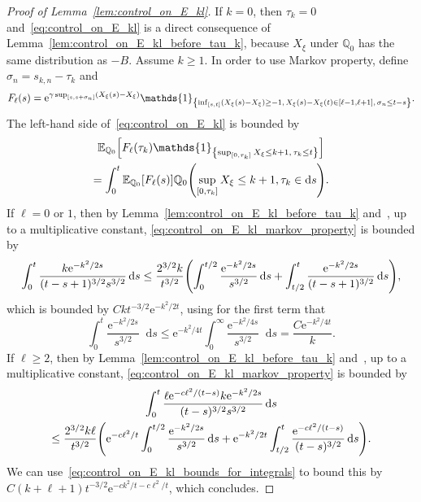 \documentclass[10pt]{amsart}
\theoremstyle{definition}\newtheorem{defi}[theo]{Definition}\newtheorem{rema}[theo]{Remark}\newtheorem{exam}[theo]{Example}\newtheorem{exem}[theo]{Example}\newtheorem{nota}[theo]{Notation}
\newcommand{\e}{\mathrm{e}}
\renewcommand{\d}[1]{\mathop{}\!\mathrm{d}#1}
\newcommand{\E}{\mathbb{E}}
\newcommand{\Q}{\mathbb{Q}}
\newcommand\1{\mathds{1}}
\newcommand*{\MK}{\mkern 2mu}
\let\originalleft\left
\let\originalright\right
\renewcommand{\left}{\mathopen{}\mathclose\bgroup\originalleft}
\renewcommand{\right}{\aftergroup\egroup\originalright}
\begin{document}
\begin{proof}[Proof of Lemma~\ref{lem:control_on_E_kl}]
If $k = 0$, then $\tau_k = 0$ and~\eqref{eq:control_on_E_kl} is a direct consequence of Lemma~\ref{lem:control_on_E_kl_before_tau_k}, because $X_\xi$ under $\Q_0$ has the same distribution as $-B$. Assume $k \geq 1$. In order to use Markov property, define $\sigma_n = s_{k, n} - \tau_k$ and
\begin{equation*}
F_{\ell}(s) = \e^{\gamma \sup_{[s, s + \sigma_n]} \left(X_\xi(s) - X_\xi\right)} \1_{\left\{\inf_{[s, t]} (X_\xi(s) - X_\xi) \geq -1,\, X_\xi(s) - X_\xi(t) \in [\ell - 1, \ell + 1],\, \sigma_n \leq t - s\right\}}.
\end{equation*}
The left-hand side of~\eqref{eq:control_on_E_kl} is bounded by
\begin{multline}\label{eq:control_on_E_kl_markov_property}
\E_{\Q_0} \left[F_{\ell}(\tau_k) \1_{\left\{\sup_{[0, \tau_k]} X_\xi \leq k + 1,\, \tau_k \leq t\right\}} \right] \\
= \int_0^t \E_{\Q_0} \left[F_{\ell}(s) \right] \Q_0 \left(\sup_{[0, \tau_k]} X_\xi \leq k + 1, \tau_k \in \d{s} \right).
\end{multline}
If $\ell = 0$ or $1$, then by Lemma~\ref{lem:control_on_E_kl_before_tau_k} and~\cite[Formula~1.2.1.4$\MK$(1)]{BorodinSalminen2002}, up to a multiplicative constant, \eqref{eq:control_on_E_kl_markov_property} is bounded by
\begin{equation*}
\int_0^t \frac{k \e^{-k^2/2s}}{(t - s + 1)^{3/2} s^{3/2}} \d{s} \leq \frac{2^{3/2} k}{t^{3/2}} \left(\int_0^{t/2} \frac{\e^{-k^2/2s}}{s^{3/2}} \d{s} + \int_{t/2}^t \frac{\e^{-k^2/2s}}{(t - s + 1)^{3/2}} \d{s} \right),
\end{equation*}
which is bounded by $C k t^{-3/2} \e^{-k^2/2t}$, using for the first term that
\begin{equation}\label{eq:control_on_E_kl_bounds_for_integrals}
\int_0^{t} \frac{\e^{-k^2/2s}}{s^{3/2}} \d{s}
\leq \e^{-k^2/4t} \int_0^\infty \frac{\e^{-k^2/4s}}{s^{3/2}} \d{s} = \frac{C \e^{-k^2/4t}}{k}.
\end{equation}
If $ \ell \geq 2$, then by Lemma~\ref{lem:control_on_E_kl_before_tau_k} and~\cite[Formula~1.2.1.4$\MK$(1)]{BorodinSalminen2002}, up to a multiplicative constant, \eqref{eq:control_on_E_kl_markov_property} is bounded by
\begin{multline*}
\int_0^t \frac{\ell \e^{-c \ell^2/(t-s)} k \e^{-k^2/2s}}{(t-s)^{3/2} s^{3/2}} \d{s} \\
\leq \frac{2^{3/2} k \ell}{t^{3/2}} \left(\e^{-c \ell^2/t} \int_0^{t/2} \frac{\e^{-k^2/2s}}{s^{3/2}} \d{s} + \e^{-k^2/2t} \int_{t/2}^t \frac{\e^{-c \ell^2/(t-s)}}{(t - s)^{3/2}} \d{s} \right).
\end{multline*}
We can use~\eqref{eq:control_on_E_kl_bounds_for_integrals} to bound this by $C (k + \ell + 1) t^{-3/2} \e^{-c k^2/t - c \ell^2/t}$, which concludes.
\end{proof}
\end{document}

